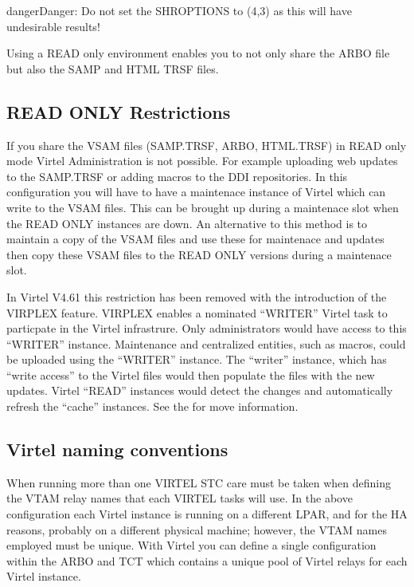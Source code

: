 \documentclass[letterpaper,10pt,english]{sphinxmanual}
\begin{document}
\begin{sphinxadmonition}{danger}{Danger:}
Do not set the SHROPTIONS to (4,3) as this will have undesirable results!
\end{sphinxadmonition}

Using a READ only environment enables you to not only share the ARBO file but also the SAMP and HTML TRSF files.


\subsection{READ ONLY Restrictions}
\label{\detokenize{connectivity_guide:read-only-restrictions}}
If you share the VSAM files (SAMP.TRSF, ARBO, HTML.TRSF) in READ only mode Virtel Administration is not possible. For example uploading web updates to the SAMP.TRSF or adding macros to the DDI repositories. In this configuration you will have to have a maintenace instance of Virtel which can write to the VSAM files. This can be brought up during a maintenace slot when the READ ONLY instances are down. An alternative to this method is to maintain a copy of the VSAM files and use these for maintenace and updates then copy these VSAM files to the READ ONLY versions during a maintenace slot.

In Virtel V4.61 this restriction has been removed with the introduction of the VIRPLEX feature. VIRPLEX enables a nominated “WRITER” Virtel task to particpate in the Virtel infrastrure. Only administrators would have access to this “WRITER” instance. Maintenance and centralized entities, such as macros, could be uploaded using the “WRITER” instance. The “writer” instance, which has “write access” to the Virtel files would then populate the files with the new updates. Virtel “READ” instances would detect the changes and automatically refresh the “cache” instances. See the {\hyperref[\detokenize{connectivity_guide:v461cn-virplex}]{}} for move information.

\newpage


\subsection{Virtel naming conventions}
\label{\detokenize{connectivity_guide:virtel-naming-conventions}}
When running more than one VIRTEL STC care must be taken when defining the VTAM relay names that each VIRTEL tasks will use. In the above configuration each Virtel instance is running on a different LPAR, and for the HA reasons, probably on a different physical machine; however, the VTAM names employed must be unique. With Virtel you can define a
single configuration within the ARBO and TCT which contains a unique pool of Virtel relays for each Virtel instance.
\end{document}
